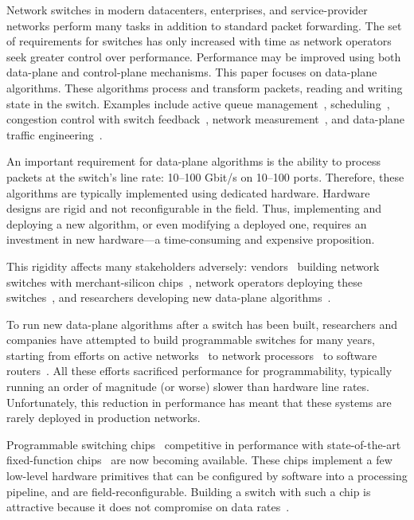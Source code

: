 Network switches in modern datacenters, enterprises, and service-provider
networks perform many tasks in addition to standard packet forwarding. The set
of requirements for switches has only increased with time as network operators
seek greater control over performance.  Performance may be improved using both
data-plane and control-plane mechanisms. This paper focuses on data-plane
algorithms. These algorithms process and transform packets, reading and
writing state in the switch. Examples include active queue
management~\cite{red,avq,codel}, scheduling~\cite{pifo_sigcomm}, congestion
control with switch feedback~\cite{xcp, rcp}, network
measurement~\cite{opensketch, bitmap_george}, and data-plane traffic
engineering~\cite{conga}.

An important requirement for data-plane algorithms is the ability to process
packets at the switch's line rate: 10--100 Gbit/s on 10--100 ports.  Therefore,
these algorithms are typically implemented using dedicated hardware.  Hardware
designs are rigid and not reconfigurable in the field. Thus, implementing and
deploying a new algorithm, or even modifying a deployed one, requires an
investment in new hardware---a time-consuming and expensive proposition.

This rigidity affects many stakeholders adversely: vendors~\cite{arista_7050, cisco_nexus,
dell_force10} building network switches with merchant-silicon
chips~\cite{trident, tomahawk, mellanox}, network operators deploying these
switches~\cite{vl2, facebook, google}, and researchers developing new data-plane
algorithms~\cite{conga, bitmap_george, xcp, rcp}.

To run new data-plane algorithms after a switch has been built, researchers and
companies have attempted to build programmable switches for many years,
starting from efforts on active networks~\cite{active-nets} to network
processors~\cite{ixp4xx} to software routers~\cite{dpdk, click}. All these
efforts sacrificed performance for programmability, typically running an order
of magnitude (or worse) slower than hardware line rates. Unfortunately, this
reduction in performance has meant that these systems are rarely deployed in
production networks.

Programmable switching chips~\cite{tofino, flexpipe, xpliant} competitive in
performance with state-of-the-art fixed-function chips~\cite{trident,
tomahawk, mellanox} are now becoming available. These chips implement a few
low-level hardware primitives that can be configured by software into a
processing pipeline, and are field-reconfigurable. Building a switch with such
a chip is attractive because it does not compromise on data rates~\cite{rmt}.

